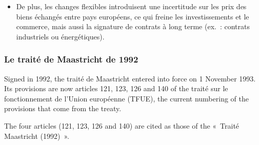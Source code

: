 \begin{example}
\begin{itemize}
      flexible en cas de déséquilibres économiques profonds. Elle a aussi souligné
      l'importance de la crédibilité des politiques économiques~: la méfiance des
      marchés envers la livre reflétait un manque de confiance dans la capacité du
      gouvernement à maîtriser l'inflation et les déficits.
    \item De plus, les changes flexibles introduisent une incertitude sur les prix des
      biens échangés entre pays européens, ce qui freine les investissements et le
      commerce, mais aussi la signature de contrats à long terme (ex.~: contrats
      industriels ou énergétiques).
  \end{itemize}
\end{example}

\subsubsection{Le traité de Maastricht de 1992}

Signed in 1992, the traité de Maastricht entered into force on 1 November 1993. Its
provisions are now articles 121, 123, 126 and 140 of the traité sur le fonctionnement
de l'Union européenne (TFUE), the current numbering of the provisions that come from
the treaty.

\begin{remark}
  The four articles (121, 123, 126 and 140) are cited as those of the «~Traité
  Maastricht (1992)~».
\end{remark}

